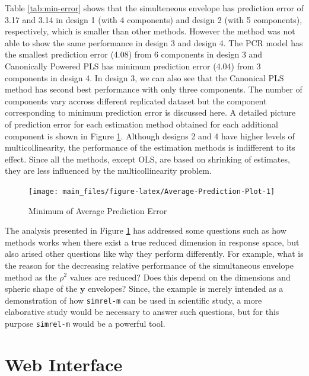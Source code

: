 \documentclass[3p,times,12pt,authoryear]{elsarticle}
\theoremstyle{definition}
\theoremstyle{definition}
\theoremstyle{remark}
\begin{document}
Table \ref{tab:min-error} shows that the simulteneous envelope has
prediction error of 3.17 and 3.14 in design 1 (with 4 components) and
design 2 (with 5 components), respectively, which is smaller than other
methods. However the method was not able to show the same performance in
design 3 and design 4. The PCR model has the smallest prediction error
(4.08) from 6 components in design 3 and Canonically Powered PLS has
minimum prediction error (4.04) from 3 components in design 4. In design
3, we can also see that the Canonical PLS method has second best
performance with only three components. The number of components vary
accross different replicated dataset but the component corresponding to
minimum prediction error is discussed here. A detailed picture of
prediction error for each estimation method obtained for each additional
component is shown in Figure \ref{fig:Average-Prediction-Plot}. Although
designs 2 and 4 have higher levels of multicollinearity, the performance
of the estimation methods is indifferent to its effect. Since all the
methods, except OLS, are based on shrinking of estimates, they are less
influenced by the multicollinearity problem.

\begin{figure}[!htb]
\texttt{[image: main\_files/figure-latex/Average-Prediction-Plot-1]} \caption{Minimum of Average Prediction Error}\label{fig:Average-Prediction-Plot}
\end{figure}

The analysis presented in Figure \ref{fig:Average-Prediction-Plot} has
addressed some questions such as how methods works when there exist a
true reduced dimension in response space, but also arised other
questions like why they perform differently. For example, what is the
reason for the decreasing relative performance of the simultaneous
envelope method as the \(\rho^2\) values are reduced? Does this depend
on the dimensions and spheric shape of the \(\mathbf{y}\) envelopes?
Since, the example is merely intended as a demonstration of how
\texttt{simrel-m} can be used in scientific study, a more elaborative
study would be necessary to answer such questions, but for this purpose
\texttt{simrel-m} would be a powerful tool.

\section{Web Interface}\label{web-interface}
\end{document}
